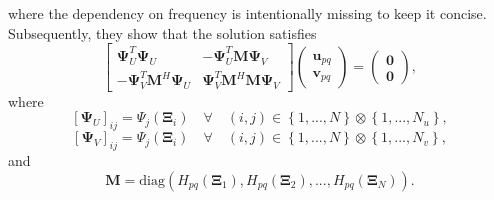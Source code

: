 where the dependency on frequency is intentionally missing to keep it concise.
{Subsequently, they show that the solution satisfies}%
\begin{equation}
    \begin{bmatrix}
        \mathbf{\Psi}_{U}^{T}
        \mathbf{\Psi}_{U}
        &
        -\mathbf{\Psi}_{U}^{T}
        \mathbf{M}
        \mathbf{\Psi}_{V}
        \\
        -\mathbf{\Psi}_{V}^{T}
        \mathbf{M}^{H}
        \mathbf{\Psi}_{U}
        &
        \mathbf{\Psi}_{V}^{T}
        \mathbf{M}^{H}
        \mathbf{M}
        \mathbf{\Psi}_{V}
    \end{bmatrix}
    \begin{pmatrix}
        \mathbf{u}_{pq} \\
        \mathbf{v}_{pq}
    \end{pmatrix}
    =
    \begin{pmatrix}
        \mathbf{0} \\
        \mathbf{0}
    \end{pmatrix},
    \label{SVD problem}
\end{equation}
{where}%
\begin{equation}
    \left[\mathbf{\Psi}_{U}\right]_{ij}
    =
    \Psi_{j} \left(\mathbf{\Xi}_{i}\right)
    \quad
    \forall
    \quad
    (i,j)\in\left\{1, ..., N\right\} \otimes
    \left\{1, ..., N_{u}\right\},
\end{equation}
\vspace{-3.0em}
\begin{equation}
    \left[\mathbf{\Psi}_{V}\right]_{ij}
    =
    \Psi_{j} \left(\mathbf{\Xi}_{i}\right)
    \quad
    \forall
    \quad
    (i,j)\in\left\{1, ..., N\right\} \otimes
    \left\{1, ..., N_{v}\right\},
\end{equation}
{and}%
\begin{equation}
    \mathbf{M}
    =
    \text{diag} \left(
        H_{pq} \left( \mathbf{\Xi}_{1} \right),
        H_{pq} \left( \mathbf{\Xi}_{2} \right),
        ..., 
        H_{pq} \left( \mathbf{\Xi}_{N} \right)
    \right).
\end{equation}